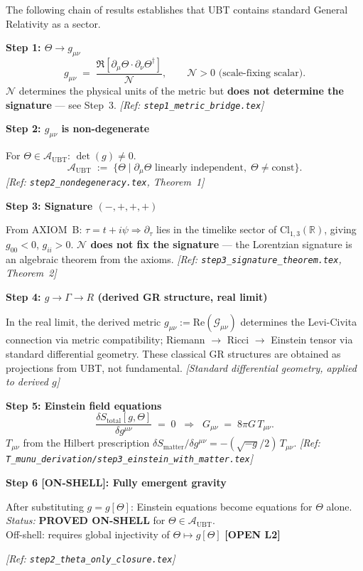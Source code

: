 \documentclass[12pt]{article}
\theoremstyle{definition}
\theoremstyle{remark}
\begin{document}
\begin{tcolorbox}[colback=blue!5!white,colframe=blue!75!black,
  title=Theorem (GR Recovery Chain)]

The following chain of results establishes that UBT contains standard
General Relativity as a sector.

\medskip
\textbf{Step 1: $\Theta \to g_{\mu\nu}$}
\[
  g_{\mu\nu} \;=\; \frac{\Re[\partial_\mu\Theta \cdot \partial_\nu\Theta^\dagger]}{\mathcal{N}},
  \qquad \mathcal{N} > 0 \text{ (scale-fixing scalar)}.
\]
$\mathcal{N}$ determines the physical units of the metric but \textbf{does not
determine the signature} — see Step~3.
\hfill\textit{[Ref: \texttt{step1\_metric\_bridge.tex}]}

\medskip
\textbf{Step 2: $g_{\mu\nu}$ is non-degenerate}

For $\Theta \in \mathcal{A}_\mathrm{UBT}$: $\det(g) \neq 0$.
\[
  \mathcal{A}_\mathrm{UBT} \;:=\;
  \{\Theta \mid \partial_\mu\Theta \text{ linearly independent},\; \Theta \neq \text{const}\}.
\]
\hfill\textit{[Ref: \texttt{step2\_nondegeneracy.tex}, Theorem~1]}

\medskip
\textbf{Step 3: Signature $(-,+,+,+)$}

From AXIOM~B: $\tau = t + i\psi \Rightarrow \partial_\tau$ lies in the timelike
sector of $\mathrm{Cl}_{1,3}(\mathbb{R})$, giving $g_{00} < 0$, $g_{ii} > 0$.
\textbf{$\mathcal{N}$ does not fix the signature} — the Lorentzian signature is
an algebraic theorem from the axioms.
\hfill\textit{[Ref: \texttt{step3\_signature\_theorem.tex}, Theorem~2]}

\medskip
\textbf{Step 4: $g \to \Gamma \to R$ (derived GR structure, real limit)}

In the real limit, the derived metric $g_{\mu\nu} := \mathrm{Re}(\mathcal{G}_{\mu\nu})$
determines the Levi-Civita connection via metric compatibility; Riemann $\to$ Ricci $\to$
Einstein tensor via standard differential geometry.
These classical GR structures are obtained as projections from UBT, not fundamental.
\hfill\textit{[Standard differential geometry, applied to derived $g$]}

\medskip
\textbf{Step 5: Einstein field equations}
\[
  \frac{\delta S_\mathrm{total}[g,\Theta]}{\delta g^{\mu\nu}} \;=\; 0
  \;\;\Longrightarrow\;\; G_{\mu\nu} \;=\; 8\pi G\, T_{\mu\nu}.
\]
$T_{\mu\nu}$ from the Hilbert prescription $\delta S_\mathrm{matter}/\delta g^{\mu\nu} =
-(\sqrt{-g}/2)\,T_{\mu\nu}$.
\hfill\textit{[Ref: \texttt{T\_munu\_derivation/step3\_einstein\_with\_matter.tex}]}

\medskip
\textbf{Step 6 [ON-SHELL]: Fully emergent gravity}

After substituting $g = g[\Theta]$: Einstein equations become equations for
$\Theta$ alone. \\
\textit{Status:} \textbf{PROVED ON-SHELL} for $\Theta \in \mathcal{A}_\mathrm{UBT}$. \\
Off-shell: requires global injectivity of $\Theta \mapsto g[\Theta]$
\hfill\textbf{[OPEN L2]}

\hfill\textit{[Ref: \texttt{step2\_theta\_only\_closure.tex}]}

\end{tcolorbox}
\end{document}
